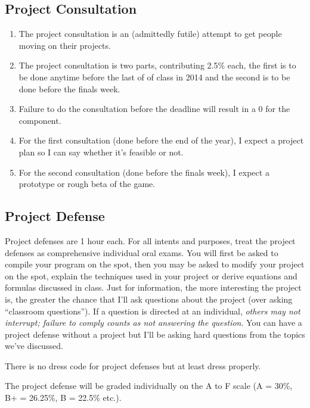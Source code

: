 \documentclass[10pt]{article}
\begin{document}
\subsection{Project Consultation}
\begin{enumerate}[noitemsep]
\item The project consultation is an (admittedly futile) attempt to get people moving on their projects.
\item The project consultation is two parts, contributing 2.5\% each, the first is to be done anytime before the last of of class in 2014 and the second is to be done before the finals week.
\item Failure to do the consultation before the deadline will result in a 0 for the component.
\item For the first consultation (done before the end of the year), I expect a project plan so I can say whether it's feasible or not.
\item For the second consultation (done before the finals week), I expect a prototype or rough beta of the game.
\end{enumerate}

\subsection{Project Defense}
Project defenses are 1 hour each. For all intents and purposes, treat the project defenses as comprehensive individual oral exams. You will first be asked to compile your program on the spot, then you may be asked to modify your project on the spot, explain the techniques used in your project or derive equations and formulas discussed in class. Just for information, the more interesting the project is, the greater the chance that I'll ask questions about the project (over asking ``classroom questions''). If a question is directed at an individual, \emph{others may not interrupt; failure to comply counts as not answering the question}. You can have a project defense without a project but I'll be asking hard questions from the topics we've discussed.

There is no dress code for project defenses but at least dress properly.

The project defense will be graded individually on the A to F scale (A = 30\%, B+ = 26.25\%, B = 22.5\% etc.).
\end{document}
